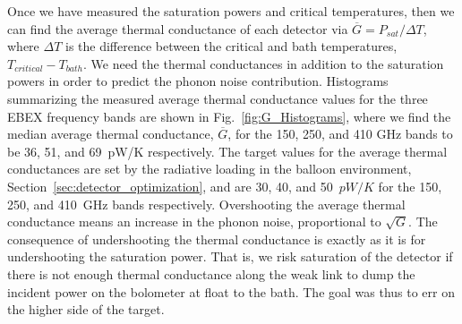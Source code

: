 \documentclass[../EBEXPaper2.tex]{subfiles}
\begin{document}
Once we have measured the saturation powers and critical temperatures, then we can find the average thermal conductance of each detector via $\overline{G} = P_{sat}/\Delta T$, where $\Delta T$ is the difference between the critical and bath temperatures, $T_{critical} - T_{bath}$. 
We need the thermal conductances in addition to the saturation powers in order to predict the phonon noise contribution. 
Histograms summarizing the measured average thermal conductance values for the three \ac{EBEX} frequency bands are shown in Fig.~\ref{fig:G_Histograms}, where we find the median average thermal conductance, $\overline{G}$, for the 150, 250, and 410 GHz bands to be 36, 51, and 69~pW/K respectively. 
The target values for the average thermal conductances are set by the radiative loading in the balloon environment, Section~\ref{sec:detector_optimization}, and are 30, 40, and 50~$pW/K$ for the 150, 250, and 410~GHz bands respectively. 
Overshooting the average thermal conductance means an increase in the phonon noise, proportional to $\sqrt{G}$. 
The consequence of undershooting the thermal conductance is exactly as it is for undershooting the saturation power. 
That is, we risk saturation of the detector if there is not enough thermal conductance along the weak link to dump the incident power on the bolometer at float to the bath. 
The goal was thus to err on the higher side of the target. 

\end{document}
